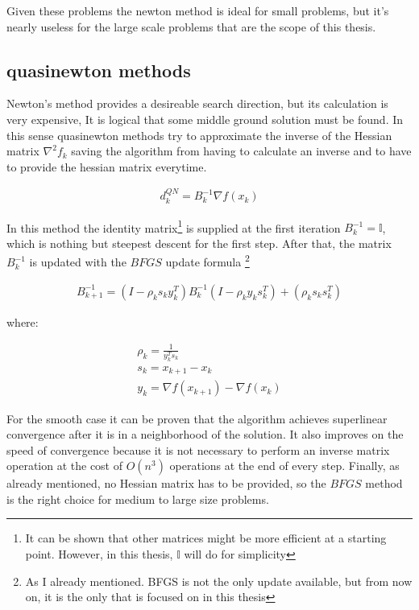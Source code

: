 Given these problems the newton method is ideal for small problems, but it's nearly useless for the large scale problems that are the scope of this thesis.

\subsection{quasinewton methods}

Newton's method provides a desireable search direction, but its calculation is very expensive, It is logical that some middle ground solution must be found. In this sense quasinewton methods try to approximate the inverse of the Hessian matrix $\nabla^2 f_k$ saving the algorithm from having to calculate an inverse and to have to provide the hessian matrix everytime.

\begin{equation}
  \begin{aligned}
    d_k^{QN} = B_k^{-1} \nabla f(x_k)
  \end{aligned}
\end{equation}

In this method the identity matrix\footnote{It can be shown that other matrices might be more efficient at a starting point. However, in this thesis, $\mathbb{I}$ will do for simplicity} is supplied at the first iteration $B_k^{-1} = \mathbb{I}$, which is nothing but steepest descent for the first step. After that, the matrix $B_k^{-1}$ is updated with the $BFGS$ update formula \footnote{As I already mentioned. BFGS is not the only update available, but from now on, it is the only that is focused on in this thesis}

\begin{equation} \label{BFGSUpdate}
  \begin{aligned}
    B_{k+1} ^{-1} = (I - \rho_k s_k y_k^T) B_k^{-1} (I - \rho_k y_k s_k^T) + (\rho_k s_k s_k^T)
  \end{aligned}
\end{equation} 

where:

\begin{equation*}
  \begin{aligned}
   \rho_k = \frac{1}{y_k^T s_k} \\
    s_k = x_{k+1} - x_k \\
    y_k = \nabla f(x_{k+1}) - \nabla f(x_k)
  \end{aligned}
\end{equation*} 

For the smooth case it can be proven that the algorithm achieves superlinear convergence after it is in a neighborhood of the solution. It also improves on the speed of convergence because it is not necessary to perform an inverse matrix operation at the cost of $O(n^3)$ operations at the end of every step. Finally, as already mentioned, no Hessian matrix has to be provided, so the $BFGS$ method is the right choice for medium to large size problems.

